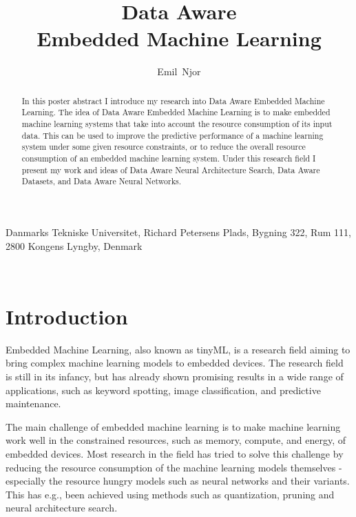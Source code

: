\documentclass{acaces}
\begin{document}
\title{Data Aware\\Embedded Machine Learning
}

\author{
    Emil~Njor
}

\address{1}{
    Danmarks Tekniske Universitet,
    Richard Petersens Plads,
    Bygning 322,
    Rum 111,
    2800 Kongens Lyngby,
    Denmark
}


\pagestyle{empty}


\begin{abstract}
    In this poster abstract I introduce my research into Data Aware Embedded Machine Learning.
    The idea of Data Aware Embedded Machine Learning is to make embedded machine learning systems that take into account the resource consumption of its input data.
    This can be used to improve the predictive performance of a machine learning system under some given resource constraints, or to reduce the overall resource consumption of an embedded machine learning system.
    Under this research field I present my work and ideas of Data Aware Neural Architecture Search, Data Aware Datasets, and Data Aware Neural Networks.
\end{abstract}
\\

\section{Introduction}
Embedded Machine Learning, also known as tinyML, is a research field aiming to bring complex machine learning models to embedded devices. 
The research field is still in its infancy, but has already shown promising results in a wide range of applications, such as keyword spotting, image classification, and predictive maintenance.

The main challenge of embedded machine learning is to make machine learning work well in the constrained resources, such as memory, compute, and energy, of embedded devices.
Most research in the field has tried to solve this challenge by reducing the resource consumption of the machine learning models themselves - especially the resource hungry models such as neural networks and their variants.
This has e.g., been achieved using methods such as quantization, pruning and neural architecture search\cite{njor2022primer}.
\end{document}
